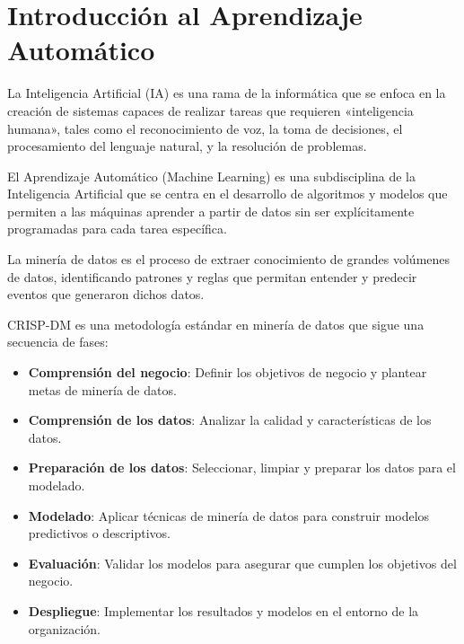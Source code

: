 \documentclass[a4,11pt]{aleph-notas}
\begin{document}
\encabezado

\section{Introducción al Aprendizaje Automático}

\begin{defi}
    La Inteligencia Artificial (IA) es una rama de la informática que se enfoca en la creación de sistemas capaces de realizar tareas que requieren «inteligencia humana», tales como el reconocimiento de voz, la toma de decisiones, el procesamiento del lenguaje natural, y la resolución de problemas.
\end{defi}

\begin{defi}
    El Aprendizaje Automático (Machine Learning) es una subdisciplina de la Inteligencia Artificial que se centra en el desarrollo de algoritmos y modelos que permiten a las máquinas aprender a partir de datos sin ser explícitamente programadas para cada tarea específica.
\end{defi}


\begin{defi}
    La minería de datos es el proceso de extraer conocimiento de grandes volúmenes de datos, identificando patrones y reglas que permitan entender y predecir eventos que generaron dichos datos.
\end{defi}

\begin{defi}
    CRISP-DM es una metodología estándar en minería de datos que sigue una secuencia de fases:
    \begin{itemize}
        \item \textbf{Comprensión del negocio}: Definir los objetivos de negocio y plantear metas de minería de datos.
        \item \textbf{Comprensión de los datos}: Analizar la calidad y características de los datos.
        \item \textbf{Preparación de los datos}: Seleccionar, limpiar y preparar los datos para el modelado.
        \item \textbf{Modelado}: Aplicar técnicas de minería de datos para construir modelos predictivos o descriptivos.
        \item \textbf{Evaluación}: Validar los modelos para asegurar que cumplen los objetivos del negocio.
        \item \textbf{Despliegue}: Implementar los resultados y modelos en el entorno de la organización.
    \end{itemize}
\end{defi}
\end{document}
